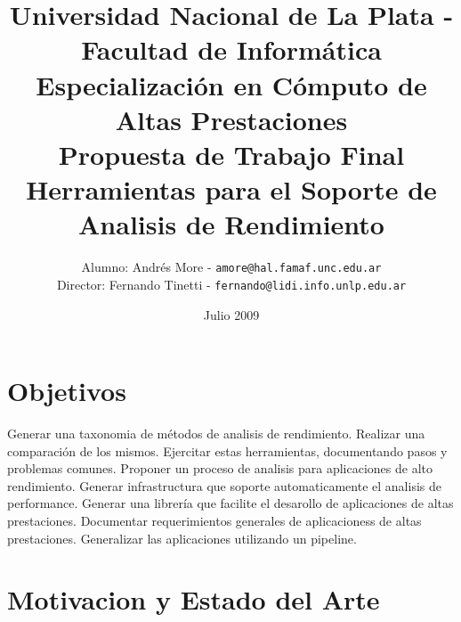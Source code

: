 \documentclass[a4paper,twocolumn]{article}
\begin{document}
\title{Universidad Nacional de La Plata - Facultad de Inform\'atica\\Especializaci\'on en C\'omputo de Altas Prestaciones\\ \bigskip Propuesta de Trabajo Final\\Herramientas para el Soporte de Analisis de Rendimiento}
\author{ Alumno: Andr\'es More - {\tt amore@hal.famaf.unc.edu.ar}\\Director: Fernando Tinetti - {\tt fernando@lidi.info.unlp.edu.ar}}
\date{Julio 2009}


\tableofcontents

\section{Objetivos}

Generar una taxonomia de m\'etodos de analisis de rendimiento.
Realizar una comparaci\'on de los mismos.
Ejercitar estas herramientas, documentando pasos y problemas comunes.
Proponer un proceso de analisis para aplicaciones de alto rendimiento.
Generar infrastructura que soporte automaticamente el analisis de performance.
Generar una librer\'ia que facilite el desarollo de aplicaciones de altas prestaciones.
Documentar requerimientos generales de aplicacioness de altas prestaciones.
Generalizar las aplicaciones utilizando un pipeline.

\section{Motivacion y Estado del Arte}
\end{document}
